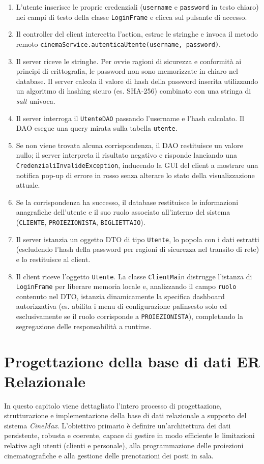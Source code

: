 \documentclass[12pt, a4paper]{article}
\begin{document}
\begin{enumerate}
    \item L'utente inserisce le proprie credenziali (\texttt{username} e \texttt{password} in testo chiaro) nei campi di testo della classe \texttt{LoginFrame} e clicca sul pulsante di accesso.
    \item Il controller del client intercetta l'action, estrae le stringhe e invoca il metodo remoto \texttt{cinemaService.autenticaUtente(username, password)}.
    \item Il server riceve le stringhe. Per ovvie ragioni di sicurezza e conformità ai principi di crittografia, le password non sono memorizzate in chiaro nel database. Il server calcola il valore di hash della password inserita utilizzando un algoritmo di hashing sicuro (es. SHA-256) combinato con una stringa di \textit{salt} univoca.
    \item Il server interroga il \texttt{UtenteDAO} passando l'username e l'hash calcolato. Il DAO esegue una query mirata sulla tabella \texttt{utente}.
    \item Se non viene trovata alcuna corrispondenza, il DAO restituisce un valore nullo; il server interpreta il risultato negativo e risponde lanciando una \texttt{CredenzialiInvalideException}, inducendo la GUI del client a mostrare una notifica pop-up di errore in rosso senza alterare lo stato della visualizzazione attuale.
    \item Se la corrispondenza ha successo, il database restituisce le informazioni anagrafiche dell'utente e il suo ruolo associato all'interno del sistema (\texttt{CLIENTE}, \texttt{PROIEZIONISTA}, \texttt{BIGLIETTAIO}).
    \item Il server istanzia un oggetto DTO di tipo \texttt{Utente}, lo popola con i dati estratti (escludendo l'hash della password per ragioni di sicurezza nel transito di rete) e lo restituisce al client.
    \item Il client riceve l'oggetto \texttt{Utente}. La classe \texttt{ClientMain} distrugge l'istanza di \texttt{LoginFrame} per liberare memoria locale e, analizzando il campo \texttt{ruolo} contenuto nel DTO, istanzia dinamicamente la specifica dashboard autorizzativa (es. abilita i menu di configurazione palinsesto solo ed esclusivamente se il ruolo corrisponde a \texttt{PROIEZIONISTA}), completando la segregazione delle responsabilità a runtime.
\end{enumerate}

\section{Progettazione della base di dati ER Relazionale} 
In questo capitolo viene dettagliato l'intero processo di progettazione, strutturazione e implementazione della base di dati relazionale a supporto del sistema \textit{CineMax}. L'obiettivo primario è definire un'architettura dei dati persistente, robusta e coerente, capace di gestire in modo efficiente le limitazioni relative agli utenti (clienti e personale), alla programmazione delle proiezioni cinematografiche e alla gestione delle prenotazioni dei posti in sala. 
\end{document}
